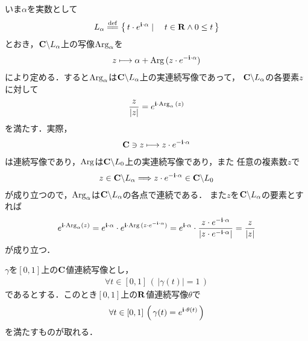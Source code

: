 	いま$\alpha$を実数として
	\begin{align}
		L_{\alpha} \defeq \Set{t \cdot e^{\isym\cdot\alpha}}{t \in \R \wedge 0 \leq t}
	\end{align}
	とおき，$\mathbf{C} \backslash L_{\alpha}$上の写像$\operatorname{Arg}_{\alpha}$を
	\begin{align}
		z \longmapsto \alpha + \operatorname{Arg}{(z \cdot e^{-\mathbf{i}\cdot\alpha})}
	\end{align}
	により定める．すると$\operatorname{Arg}_{\alpha}$は$\mathbf{C} \backslash L_{\alpha}$上の実連続写像であって，
	$\mathbf{C} \backslash L_{\alpha}$の各要素$z$に対して
	\begin{align}
		\frac{z}{|z|} = e^{\mathbf{i} \cdot \operatorname{Arg}_{\alpha}{(z)}}
	\end{align}
	を満たす．実際，
	\begin{align}
		\mathbf{C} \ni z \longmapsto z \cdot e^{-\mathbf{i} \cdot \alpha}
	\end{align}
	は連続写像であり，$\operatorname{Arg}$は$\mathbf{C} \backslash L_{0}$上の実連続写像であり，また
	任意の複素数$z$で
	\begin{align}
		z \in \mathbf{C} \backslash L_{\alpha} \Longrightarrow z \cdot e^{-\mathbf{i} \cdot \alpha} \in \mathbf{C} \backslash L_{0}
	\end{align}
	が成り立つので，$\operatorname{Arg}_{\alpha}$は$\mathbf{C} \backslash L_{\alpha}$の各点で連続である．
	また$z$を$\mathbf{C} \backslash L_{\alpha}$の要素とすれば
	\begin{align}
		e^{\mathbf{i} \cdot \operatorname{Arg}_{\alpha}(z)}
		= e^{\mathbf{i} \cdot \alpha} \cdot e^{\mathbf{i} \cdot \operatorname{Arg}{(z \cdot e^{-\mathbf{i}\cdot\alpha})}}
		= e^{\mathbf{i} \cdot \alpha} \cdot \frac{z \cdot e^{-\mathbf{i}\cdot\alpha}}{\left|z \cdot e^{-\mathbf{i}\cdot\alpha}\right|}
		= \frac{z}{|z|}
	\end{align}
	が成り立つ．
	
	\begin{screen}
		\begin{thm}[路の偏角の連続選択]\label{thm:continuous_choice_of_arguments}
			$\gamma$を$[0,1]$上の$\mathbf{C}$値連続写像とし，
			\begin{align}
				\forall t \in [0,1]\, (\, |\gamma(t)| = 1\, )
			\end{align}
			であるとする．このとき$[0,1]$上の$\mathbf{R}$値連続写像$\theta$で
			\begin{align}
				\forall t \in [0,1]\, \left(\, \gamma(t) = e^{\mathbf{i}\cdot\theta(t)}\, \right)
			\end{align}
			を満たすものが取れる．
		\end{thm}
	\end{screen}
	
